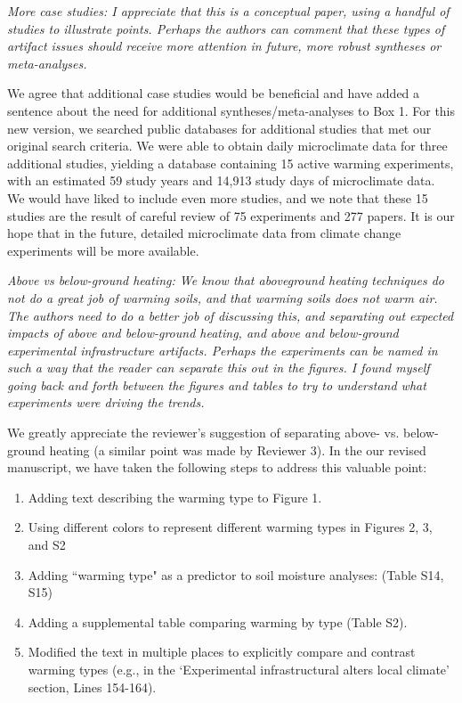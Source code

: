 \documentclass[11pt,a4paper]{letter}
\begin{document}
\begin{letter}{}
\par \emph{More case studies:  I appreciate that this is a conceptual paper, using a handful of studies to illustrate points.  Perhaps the authors can comment that these types of artifact issues should receive more attention in future, more robust syntheses or meta-analyses.}
\par We agree that additional case studies would be beneficial and have added a sentence about the need for additional syntheses/meta-analyses to Box 1. For this new version, we searched public databases for additional studies that met our original search criteria. We were able to obtain daily microclimate data for three additional studies, yielding a database containing 15 active warming experiments, with an estimated 59 study years and 14,913 study days of microclimate data. We would have liked to include even more studies, and we note that these 15 studies are the result of careful review of 75 experiments and 277 papers. It is our hope that in the future, detailed microclimate data from climate change experiments will be more available.   

\par \emph{Above vs below-ground heating:  We know that aboveground heating techniques do not do a great job of warming soils, and that warming soils does not warm air. The authors need to do a better job of discussing this, and separating out expected impacts of above and below-ground heating, and above and below-ground experimental infrastructure artifacts.  Perhaps the experiments can be named in such a way that the reader can separate this out in the figures. I found myself going back and forth between the figures and tables to try to understand what experiments were driving the trends.} 
\par 
We greatly appreciate the reviewer's suggestion of separating above- vs. below-ground heating (a similar point was made by Reviewer 3). In the our revised manuscript, we have taken the following steps to address this valuable point:
\begin{enumerate}
\item Adding text describing the warming type to Figure 1.
\item Using different colors  to represent different warming types in Figures 2, 3, and S2
\item Adding ``warming type" as a predictor to soil moisture analyses: (Table S14, S15)
\item Adding a supplemental table comparing warming by type (Table S2).
\item Modified the text in multiple places to explicitly compare and contrast warming types (e.g., in the `Experimental infrastructural alters local climate' section, Lines 154-164). 
\end{enumerate}


\end{letter}
\end{document}
